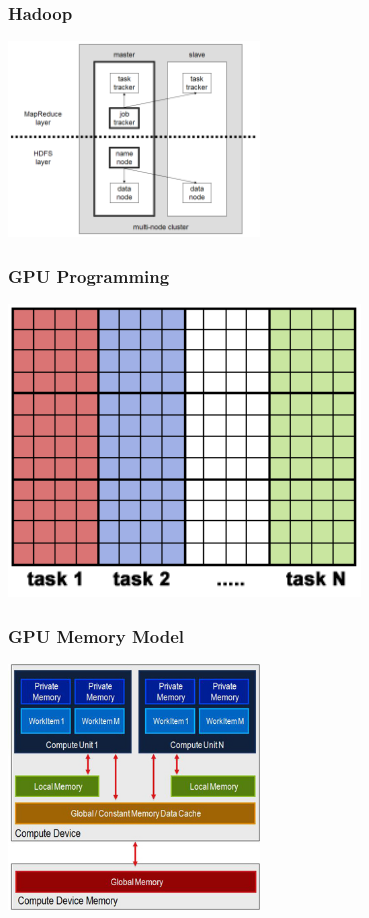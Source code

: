 \documentclass[t]{beamer}
\begin{document}
\begin{frame}
\frametitle{Hadoop}
\begin{center}
\includegraphics[width=0.5\textwidth]{img/Hadoop_1.png} 
\end{center}
\end{frame}


\begin{frame}
\frametitle{GPU Programming}
\begin{center}
  \includegraphics[width=0.7\textwidth]{img/array.png} 
\end{center}
\end{frame}

\begin{frame}
\frametitle{GPU Memory Model}
\begin{center}
  \includegraphics[width=0.5\textwidth]{img/OpenCLMemory.png} 
\end{center}
\end{frame}
\end{document}
